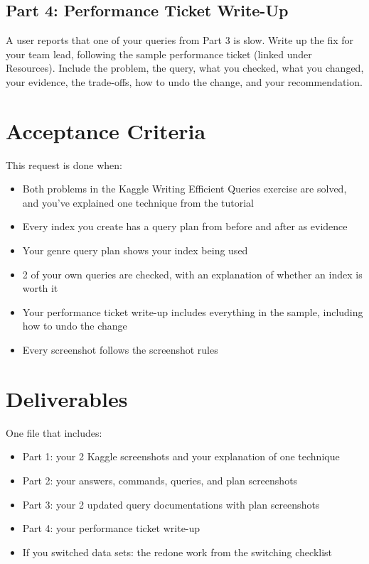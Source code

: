 \documentclass[12pt]{article}
\begin{document}
\subsection*{Part 4: Performance Ticket Write-Up}
A user reports that one of your queries from Part 3 is slow. Write up the fix for your team lead, following the sample performance ticket (linked under Resources). Include the problem, the query, what you checked, what you changed, your evidence, the trade-offs, how to undo the change, and your recommendation.

\section*{Acceptance Criteria}
This request is done when:
\begin{itemize}
    \item Both problems in the Kaggle Writing Efficient Queries exercise are solved, and you've explained one technique from the tutorial
    \item Every index you create has a query plan from before and after as evidence
    \item Your genre query plan shows your index being used
    \item 2 of your own queries are checked, with an explanation of whether an index is worth it
    \item Your performance ticket write-up includes everything in the sample, including how to undo the change
    \item Every screenshot follows the screenshot rules
\end{itemize}

\section*{Deliverables}
One file that includes:
\begin{itemize}
    \item Part 1: your 2 Kaggle screenshots and your explanation of one technique
    \item Part 2: your answers, commands, queries, and plan screenshots
    \item Part 3: your 2 updated query documentations with plan screenshots
    \item Part 4: your performance ticket write-up
    \item If you switched data sets: the redone work from the switching checklist
\end{itemize}
\end{document}
